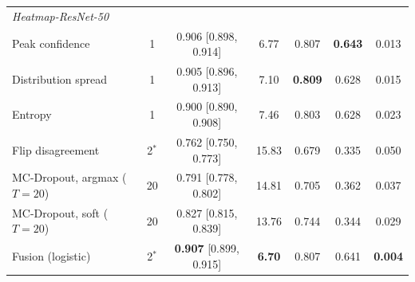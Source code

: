 \begin{tabular}{lcccccc}
\midrule
\multicolumn{7}{l}{\textit{Heatmap-ResNet-50}} \\
Peak confidence & 1 & 0.906 {\scriptsize [0.898, 0.914]} & 6.77 & 0.807 & \textbf{0.643} & 0.013 \\
Distribution spread & 1 & 0.905 {\scriptsize [0.896, 0.913]} & 7.10 & \textbf{0.809} & 0.628 & 0.015 \\
Entropy & 1 & 0.900 {\scriptsize [0.890, 0.908]} & 7.46 & 0.803 & 0.628 & 0.023 \\
Flip disagreement & 2$^\ast$ & 0.762 {\scriptsize [0.750, 0.773]} & 15.83 & 0.679 & 0.335 & 0.050 \\
MC-Dropout, argmax ($T{=}20$) & 20 & 0.791 {\scriptsize [0.778, 0.802]} & 14.81 & 0.705 & 0.362 & 0.037 \\
MC-Dropout, soft ($T{=}20$) & 20 & 0.827 {\scriptsize [0.815, 0.839]} & 13.76 & 0.744 & 0.344 & 0.029 \\
Fusion (logistic) & 2$^\ast$ & \textbf{0.907} {\scriptsize [0.899, 0.915]} & \textbf{6.70} & 0.807 & 0.641 & \textbf{0.004} \\
\bottomrule
\end{tabular}
